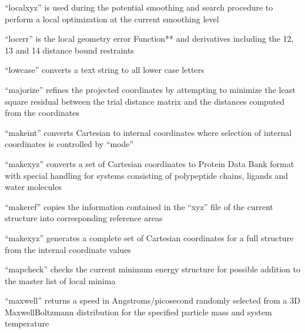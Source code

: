 \documentclass[letterpaper,11pt,english]{sphinxmanual}
\begin{document}

“localxyz” is used during the potential smoothing and search procedure to perform a local optimization at the current smoothing level


“locerr” is the local geometry error Function** and derivatives including the 1\sphinxhyphen{}2, 1\sphinxhyphen{}3 and 1\sphinxhyphen{}4 distance bound restraints


“lowcase” converts a text string to all lower case letters


“majorize” refines the projected coordinates by attempting to minimize the least square residual between the trial distance matrix and the distances computed from the coordinates


“makeint” converts Cartesian to internal coordinates where selection of internal coordinates is controlled by “mode”


“makexyz” converts a set of Cartesian coordinates to Protein Data Bank format with special handling for systems consisting of polypeptide chains, ligands and water molecules


“makeref” copies the information contained in the “xyz” file of the current structure into corresponding reference areas


“makexyz” generates a complete set of Cartesian coordinates for a full structure from the internal coordinate values


“mapcheck” checks the current minimum energy structure for possible addition to the master list of local minima


“maxwell” returns a speed in Angstroms/picosecond randomly selected from a 3\sphinxhyphen{}D Maxwell\sphinxhyphen{}Boltzmann distribution for the specified particle mass and system temperature

\end{document}

